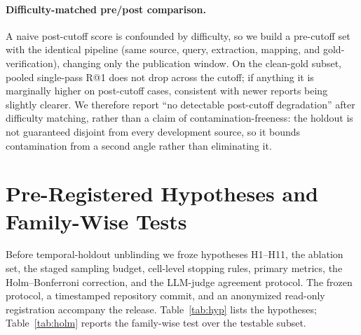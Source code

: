\documentclass[letterpaper]{article} %
\begin{document}
\paragraph{Difficulty-matched pre/post comparison.}
A naive post-cutoff score is confounded by difficulty, so we build a pre-cutoff
set with the identical pipeline (same source, query, extraction, mapping, and
gold-verification), changing only the publication window. On the clean-gold
subset, pooled single-pass R@1 does not drop across the cutoff; if anything it is
marginally higher on post-cutoff cases, consistent with newer reports being
slightly clearer. We therefore report ``no detectable post-cutoff degradation''
after difficulty matching, rather than a claim of contamination-freeness: the
holdout is not guaranteed disjoint from every development source, so it bounds
contamination from a second angle rather than eliminating it.

\section{Pre-Registered Hypotheses and Family-Wise Tests}
\label{app:hypotheses}

Before temporal-holdout unblinding we froze hypotheses H1--H11, the ablation
set, the staged sampling budget, cell-level stopping rules, primary metrics, the
Holm--Bonferroni correction, and the LLM-judge agreement protocol. The frozen
protocol, a timestamped repository commit, and an anonymized read-only
registration accompany the release. Table~\ref{tab:hyp} lists the hypotheses;
Table~\ref{tab:holm} reports the family-wise test over the testable subset.
\end{document}
